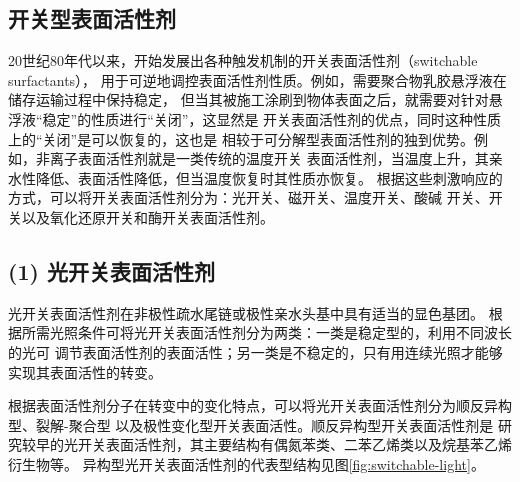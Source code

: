 \documentclass[bachelor,fandolfonts,replaceperiod]{jnuthesis}
\begin{document}
    
   \subsection{开关型表面活性剂}
    20世纪80年代以来，开始发展出各种触发机制的开关表面活性剂（switchable surfactants），
    用于可逆地调控表面活性剂性质。例如，需要聚合物乳胶悬浮液在储存运输过程中保持稳定，
    但当其被施工涂刷到物体表面之后，就需要对针对悬浮液“稳定”的性质进行“关闭”，这显然是
    开关表面活性剂的优点\cite{jessop2012}，同时这种性质上的“关闭”是可以恢复的，这也是
    相较于可分解型表面活性剂的独到优势。例如，非离子表面活性剂就是一类传统的温度开关
    表面活性剂，当温度上升，其亲水性降低、表面活性降低，但当温度恢复时其性质亦恢复。
    根据这些刺激响应的方式，可以将开关表面活性剂分为：光开关、磁开关、温度开关、酸碱
    开关、开关以及氧化还原开关和酶开关表面活性剂\cite{秦勇2009}。
    
    \subsection*{(1) 光开关表面活性剂}
    光开关表面活性剂在非极性疏水尾链或极性亲水头基中具有适当的显色基团\cite{张冤帝2017}。
    根据所需光照条件可将光开关表面活性剂分为两类：一类是稳定型的，利用不同波长的光可
    调节表面活性剂的表面活性；另一类是不稳定的，只有用连续光照才能够实现其表面活性的转变。
    
    根据表面活性剂分子在转变中的变化特点，可以将光开关表面活性剂分为顺反异构型、裂解-聚合型
    以及极性变化型开关表面活性\cite{张冤帝2017,李云霞2011}。顺反异构型开关表面活性剂是
    研究较早的光开关表面活性剂，其主要结构有偶氮苯类、二苯乙烯类以及烷基苯乙烯衍生物等。
    异构型光开关表面活性剂的代表型结构见图\ref{fig:switchable-light}\cite{张冤帝2017,karthaus1996,shang2003,吕湘亮2018}。
    
\end{document}
